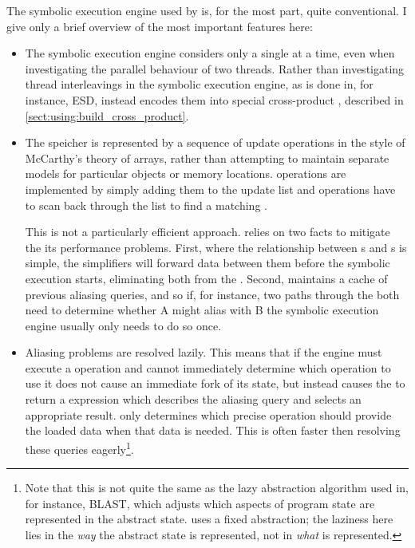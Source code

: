 The symbolic execution engine used by {\implementation} is, for the
most part, quite conventional.  I give only a brief overview of the
most important features here:
\begin{itemize}
\item The symbolic execution engine considers only a single
  {\StateMachine} at a time, even when investigating the parallel
  behaviour of two threads.  Rather than investigating thread
  interleavings in the symbolic execution engine, as is done in, for
  instance, ESD\cite{Zamfir2010}, {\technique} instead encodes them
  into special cross-product {\StateMachines}, described in
  \autoref{sect:using:build_cross_product}.

\item The {\StateMachine} speicher is represented by a sequence of
  update operations in the style of McCarthy's theory of
  arrays\needCite{}, rather than attempting to maintain separate
  models for particular objects or memory locations.  
  operations are implemented by simply adding them to the update list
  and  operations have to scan back through the list to
  find a matching .

  This is not a particularly efficient approach.  {\Implementation}
  relies on two facts to mitigate the its performance problems.
  First, where the relationship between s and
  s is simple, the {\StateMachine} simplifiers will
  forward data between them before the symbolic execution starts,
  eliminating both from the {\StateMachine}.  Second,
  {\implementation} maintains a cache of previous aliasing queries,
  and so if, for instance, two paths through the {\StateMachine} both
  need to determine whether  A might alias with
   B the symbolic execution engine usually only needs to
  do so once.

\item Aliasing problems are resolved lazily.  This means that if the
  engine must execute a  operation and cannot immediately
  determine which  operation to use it does not cause an
  immediate fork of its state, but instead causes the  to
  return a {\StateMachine} expression which describes the aliasing
  query and selects an appropriate result.  {\Implementation} only
  determines which precise  operation should provide the
  loaded data when that data is needed.  This is often faster then
  resolving these queries eagerly\footnote{Note that this is not quite
    the same as the lazy abstraction algorithm used in, for instance,
    BLAST\cite{Henzinger2002}, which adjusts which aspects of program
    state are represented in the abstract state.  {\Implementation}
    uses a fixed abstraction; the laziness here lies in the \emph{way}
    the abstract state is represented, not in \emph{what} is
    represented.}.


\end{itemize}
